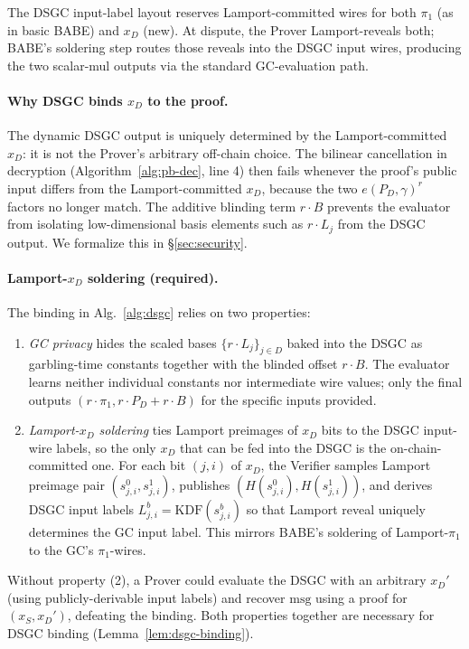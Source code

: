 \documentclass[11pt]{article}
\newcommand{\msg}{\mathrm{msg}}
\begin{document}
The DSGC input-label layout reserves Lamport-committed wires for
both $\pi_1$ (as in basic BABE) and $x_D$ (new). At dispute, the
Prover Lamport-reveals both; BABE's soldering step routes those
reveals into the DSGC input wires, producing the two scalar-mul
outputs via the standard GC-evaluation path.

\paragraph{Why DSGC binds $x_D$ to the proof.}
The dynamic DSGC output is uniquely determined by the
Lamport-committed $x_D$: it is not the Prover's arbitrary off-chain
choice. The bilinear cancellation in decryption
(Algorithm~\ref{alg:pb-dec}, line 4) then fails whenever the proof's
public input differs from the Lamport-committed $x_D$, because the
two $e(P_D, \gamma)^r$ factors no longer match. The additive blinding
term $r \cdot B$ prevents the evaluator from isolating
low-dimensional basis elements such as $r \cdot L_j$ from the DSGC
output. We formalize this in
\S\ref{sec:security}.

\paragraph{Lamport-$x_D$ soldering (required).}
The binding in Alg.~\ref{alg:dsgc} relies on two properties:
\begin{enumerate}
  \item \emph{GC privacy} hides the scaled bases
    $\{r \cdot L_j\}_{j \in D}$ baked into the DSGC as garbling-time
    constants together with the blinded offset $r \cdot B$. The
    evaluator learns neither individual constants nor intermediate
    wire values; only the final outputs
    $(r \cdot \pi_1, r \cdot P_D + r \cdot B)$ for the specific
    inputs provided.
  \item \emph{Lamport-$x_D$ soldering} ties Lamport preimages of
    $x_D$ bits to the DSGC input-wire labels, so the only $x_D$ that
    can be fed into the DSGC is the on-chain-committed one. For each
    bit $(j, i)$ of $x_D$, the Verifier samples Lamport preimage pair
    $(s_{j,i}^0, s_{j,i}^1)$, publishes
    $(H(s_{j,i}^0), H(s_{j,i}^1))$, and derives DSGC input labels
    $L_{j,i}^b = \mathrm{KDF}(s_{j,i}^b)$ so that Lamport reveal
    uniquely determines the GC input label. This mirrors BABE's
    soldering of Lamport-$\pi_1$ to the GC's $\pi_1$-wires.
\end{enumerate}
Without property (2), a Prover could evaluate the DSGC with an
arbitrary $x_D'$ (using publicly-derivable input labels) and recover
$\msg$ using a proof for $(x_S, x_D')$, defeating the binding. Both
properties together are necessary for DSGC binding
(Lemma~\ref{lem:dsgc-binding}).
\end{document}
